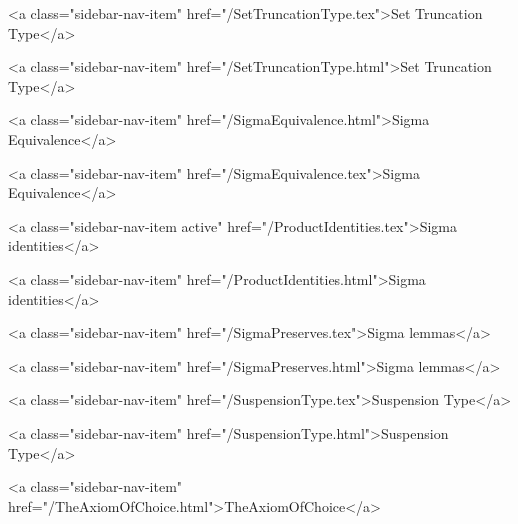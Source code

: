       
        
          <a class="sidebar-nav-item" href="/SetTruncationType.tex">Set Truncation Type</a>
        
      
    
      
        
          <a class="sidebar-nav-item" href="/SetTruncationType.html">Set Truncation Type</a>
        
      
    
      
        
          <a class="sidebar-nav-item" href="/SigmaEquivalence.html">Sigma Equivalence</a>
        
      
    
      
        
          <a class="sidebar-nav-item" href="/SigmaEquivalence.tex">Sigma Equivalence</a>
        
      
    
      
        
          <a class="sidebar-nav-item active" href="/ProductIdentities.tex">Sigma identities</a>
        
      
    
      
        
          <a class="sidebar-nav-item" href="/ProductIdentities.html">Sigma identities</a>
        
      
    
      
        
          <a class="sidebar-nav-item" href="/SigmaPreserves.tex">Sigma lemmas</a>
        
      
    
      
        
          <a class="sidebar-nav-item" href="/SigmaPreserves.html">Sigma lemmas</a>
        
      
    
      
        
          <a class="sidebar-nav-item" href="/SuspensionType.tex">Suspension Type</a>
        
      
    
      
        
          <a class="sidebar-nav-item" href="/SuspensionType.html">Suspension Type</a>
        
      
    
      
        
          <a class="sidebar-nav-item" href="/TheAxiomOfChoice.html">TheAxiomOfChoice</a>
        
